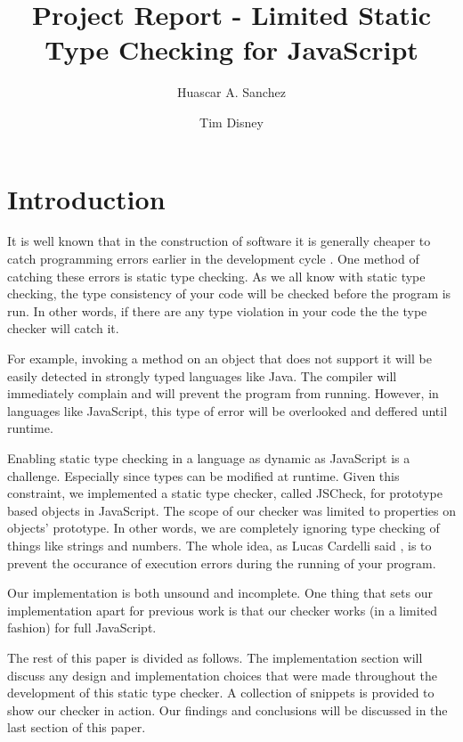 \documentclass{article}
\begin{document}
\title{Project Report - Limited Static Type Checking for JavaScript}
\author{Huascar A. Sanchez \and Tim Disney}

\maketitle

\lstset{showstringspaces=false}

\section{Introduction}
It is well known that in the construction of software it is generally cheaper to 
catch programming errors earlier in the development cycle \cite{cc2}. One method 
of catching these errors is static type checking. As we all know with static type 
checking, the type consistency of your code will be checked before the program is 
run. In other words, if there are any type violation in your code the the type 
checker will catch it. 

For example, invoking a method on an object that does not support it will be easily 
detected in strongly typed languages like Java. The compiler will immediately 
complain and will prevent the program from running. However, in languages like 
JavaScript, this type of error will be overlooked and deffered until runtime.

Enabling static type checking in a language as dynamic as JavaScript is a 
challenge. Especially since types can be modified at runtime. Given this constraint, 
we implemented a static type checker, called JSCheck, for prototype based objects 
in JavaScript. The scope of our checker was limited to properties on objects' 
prototype. In other words, we are completely ignoring type checking of things 
like strings and numbers. The whole idea, as Lucas Cardelli said \cite{typesystems}, 
is to prevent the occurance of execution errors during the running of your program. 

Our implementation is both unsound and incomplete. One thing that sets our 
implementation apart for previous work is that our checker works (in a limited 
fashion) for full JavaScript.

The rest of this paper is divided as follows. The implementation section will discuss 
any design and implementation choices that were made throughout the development 
of this static type checker. A collection of snippets is provided to show our checker 
in action. Our findings and conclusions will be discussed in the last section of 
this paper.
\end{document}
